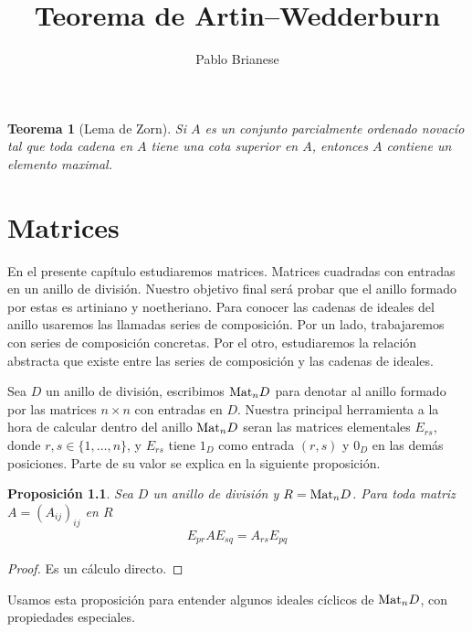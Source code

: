 \documentclass{report}
\title{Teorema de Artin--Wedderburn}
\author{Pablo Brianese}
\newcommand{\Mat}{\textnormal{Mat}}
\newtheorem{theorem}{Teorema}
\newtheorem{proposition}{Proposición}
\begin{document}
  \maketitle

  \begin{theorem}[Lema de Zorn]
    Si \(A\) es un conjunto parcialmente ordenado novacío tal que toda cadena en \(A\) tiene una cota superior en \(A\), entonces \(A\) contiene un elemento maximal.
  \end{theorem}

  \chapter{Matrices}

  En el presente capítulo estudiaremos matrices.
  Matrices cuadradas con entradas en un anillo de división.
  Nuestro objetivo final será probar que el anillo formado por estas es artiniano y noetheriano.
  Para conocer las cadenas de ideales del anillo usaremos las llamadas series de composición.
  Por un lado, trabajaremos con series de composición concretas.
  Por el otro, estudiaremos la relación abstracta que existe entre las series de composición y las cadenas de ideales.

  Sea \(D\) un anillo de división, escribimos \(\Mat_n D\) para denotar al anillo formado por las matrices \(n \times n\) con entradas en \(D\).
  Nuestra principal herramienta a la hora de calcular dentro del anillo \(\Mat_n D\) seran las matrices elementales \(E_{r s}\), donde \(r, s \in \{1, \dots, n\}\), y \(E_{r s}\) tiene \(1_D\) como entrada \((r, s)\) y \(0_D\) en las demás posiciones.
  Parte de su valor se explica en la siguiente proposición.
  \begin{proposition}
    \label{proposition:matrixEntryCalculation}
    Sea \(D\) un anillo de división y \(R = \Mat_n D\).
    Para toda matriz \(A = (A_{i j})_{i j}\) en \(R\)
    \begin{align}
      E_{p r} A E_{s q}
      =
      A_{r s} E_{p q}
    \end{align}
  \end{proposition}
  \begin{proof}
    Es un cálculo directo.
  \end{proof}

  Usamos esta proposición para entender algunos ideales cíclicos de \(\Mat_n D\), con propiedades especiales.
\end{document}
